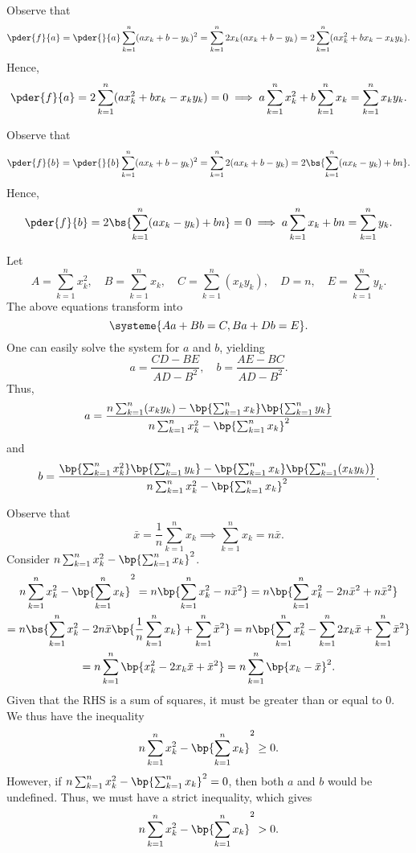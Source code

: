 \begin{solution}
    \begin{ppart}
        Observe that \[\pder{f}{a} = \pder{}{a} \sum_{k = 1}^n (ax_k + b - y_k)^2 = \sum_{k = 1}^n 2x_k(ax_k + b - y_k) = 2\sum_{k = 1}^n (ax_k^2 + bx_k - x_ky_k).\] Hence, \[\pder{f}{a} = 2\sum_{k = 1}^n (ax_k^2 + bx_k - x_ky_k) = 0 \implies a \sum_{k = 1}^n x_k^2 + b \sum_{k = 1}^n x_k = \sum_{k = 1}^n x_ky_k.\]

        Observe that \[\pder{f}{b} = \pder{}{b} \sum_{k = 1}^n (ax_k + b - y_k)^2 = \sum_{k = 1}^n 2(ax_k + b - y_k) = 2\bs{\sum_{k = 1}^n (ax_k - y_k) + bn}.\] Hence, \[\pder{f}{b} = 2\bs{\sum_{k = 1}^n (ax_k - y_k) + bn} = 0 \implies a \sum_{k = 1}^n x_k + bn = \sum_{k = 1}^n y_k.\]
    \end{ppart}
    \begin{ppart}
        Let \[A = \sum_{k = 1}^n x_k^2, \quad B = \sum_{k = 1}^n x_k, \quad C = \sum_{k = 1}^n (x_k y_k), \quad D = n, \quad E = \sum_{k = 1}^n y_k.\] The above equations transform into \[\systeme{Aa + Bb = C, Ba + Db = E}.\] One can easily solve the system for $a$ and $b$, yielding \[a = \frac{CD - BE}{AD - B^2}, \quad b = \frac{AE - BC}{AD - B^2}.\] Thus, \[a = \frac{n\sum_{k = 1}^n (x_k y_k) - \bp{\sum_{k = 1}^n x_k}\bp{\sum_{k = 1}^n y_k}}{n\sum_{k = 1}^n x_k^2 - \bp{\sum_{k = 1}^n x_k}^2}\] and \[b = \frac{\bp{\sum_{k = 1}^n x_k^2}\bp{\sum_{k = 1}^n y_k} - \bp{\sum_{k = 1}^n x_k}\bp{\sum_{k = 1}^n (x_k y_k)}}{n\sum_{k = 1}^n x_k^2 - \bp{\sum_{k = 1}^n x_k}^2}.\]
    \end{ppart}
    \begin{ppart}
        Observe that \[\bar{x} =  \frac1n \sum_{k = 1}^n x_k \implies \sum_{k = 1}^n x_k = n \bar{x}.\] Consider $ n \sum_{k = 1}^n x_k^2 - \bp{\sum_{k = 1}^n x_k}^2$.
        \begin{gather*}
            n \sum_{k = 1}^n x_k^2 - \bp{\sum_{k = 1}^n x_k}^2 = n \bp{\sum_{k = 1}^n x_k^2 - n\bar{x}^2} = n \bp{\sum_{k = 1}^n x_k^2 - 2n\bar{x}^2 + n\bar{x}^2} \\
            = n \bs{\sum_{k = 1}^n x_k^2 - 2n\bar{x} \bp{\frac1n \sum_{k = 1}^n x_k} + \sum_{k = 1}^n \bar{x}^2} = n \bp{\sum_{k = 1}^n x_k^2 - \sum_{k = 1}^n 2x_k\bar{x} + \sum_{k = 1}^n \bar{x}^2} \\
            = n \sum_{k = 1}^n \bp{x_k^2 -  2x_k\bar{x} + \bar{x}^2} = n \sum_{k = 1}^n \bp{x_k - \bar{x}}^2.
        \end{gather*}
        Given that the RHS is a sum of squares, it must be greater than or equal to 0. We thus have the inequality \[n \sum_{k = 1}^n x_k^2 - \bp{\sum_{k = 1}^n x_k}^2 \geq 0.\] However, if $ n \sum_{k = 1}^n x_k^2 - \bp{\sum_{k = 1}^n x_k}^2 = 0$, then both $a$ and $b$ would be undefined. Thus, we must have a strict inequality, which gives \[n \sum_{k = 1}^n x_k^2 - \bp{\sum_{k = 1}^n x_k}^2 > 0.\]

\end{ppart}
\end{solution}
